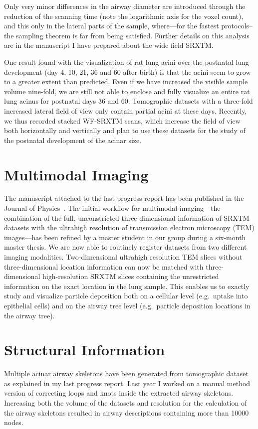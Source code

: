 \documentclass[a4paper,twoside,DIV=calc]{scrartcl}
\begin{document}
Only very minor differences in the airway diameter are introduced through the reduction of the scanning time (note the logarithmic axis for the voxel count), and this only in the lateral parts of the sample, where---for the fastest protocols--the sampling theorem is far from being satisfied. Further details on this analysis are in the manuscript I have prepared about the wide field SRXTM.

One result found with the visualization of rat lung acini over the postnatal lung development (day 4, 10, 21, 36 and 60 after birth) is that the acini seem to grow to a greater extent than predicted. Even if we have increased the visible sample volume nine-fold, we are still not able to enclose and fully visualize an entire rat lung acinus for postnatal days 36 and 60. Tomographic datasets with a three-fold increased lateral field of view only contain partial acini at these days. Recently, we thus recorded stacked WF-SRXTM scans, which increase the field of view both horizontally and vertically and plan to use these datasets for the study of the postnatal development of the acinar size.

\section{Multimodal Imaging}
The manuscript attached to the last progress report has been published in the Journal of Physics~\cite{Haberthuer2009}. The initial workflow for multimodal imaging---the combination of the full, unconstricted three-dimensional information of SRXTM datasets with the ultrahigh resolution of transmission electron microscopy (TEM) images---has been refined by a master student in our group during a six-month master thesis. We are now able to routinely register datasets from two different imaging modalities. Two-dimensional ultrahigh resolution TEM slices without three-dimensional location information can now be matched with three-dimensional high-resolution SRXTM slices containing the unrestricted information on the exact location in the lung sample. This enables us to exactly study and visualize particle deposition both on a cellular level (e.g.\, uptake into epithelial cells) and on the airway tree level (e.g.\, particle deposition locations in the airway tree).

\section{Structural Information}
Multiple acinar airway skeletons have been generated from tomographic dataset as explained in my last progress report. Last year I worked on a manual method version of correcting loops and knots inside the extracted airway skeletons. Increasing both the volume of the datasets and resolution for the calculation of the airway skeletons resulted in airway descriptions containing more than \num{10000} nodes.
\end{document}
